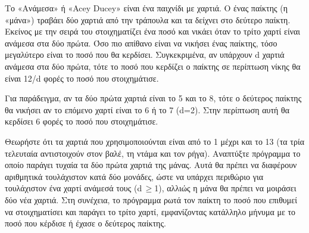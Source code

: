 \documentclass[a4paper,11pt,oneside]{book}
\begin{document}
\begin{exercise}
Το «Ανάμεσα» ή «Acey Ducey» είναι ένα παιχνίδι με χαρτιά. Ο ένας παίκτης (η «μάνα») τραβάει δύο χαρτιά από την τράπουλα και τα δείχνει στο δεύτερο παίκτη. Εκείνος με την σειρά του στοιχηματίζει ένα ποσό και νικάει όταν το τρίτο χαρτί είναι ανάμεσα στα δύο πρώτα. Όσο πιο απίθανο είναι να νικήσει ένας παίκτης, τόσο μεγαλύτερο είναι το ποσό που θα κερδίσει. Συγκεκριμένα, αν υπάρχουν d χαρτιά ανάμεσα στα δύο πρώτα, τότε το ποσό που κερδίζει ο παίκτης σε περίπτωση νίκης θα είναι 12/d φορές το ποσό που στοιχημάτισε.

\begin{note}
Για παράδειγμα, αν τα δύο πρώτα χαρτιά είναι το 5 και το 8, τότε ο δεύτερος παίκτης θα νικήσει αν το επόμενο χαρτί είναι το 6 ή το 7 (d=2). Στην περίπτωση αυτή θα κερδίσει 6 φορές το ποσό που στοιχημάτισε.
\end{note}

Θεωρήστε ότι τα χαρτιά που χρησιμοποιούνται είναι από το 1 μέχρι και το 13 (τα τρία τελευταία αντιστοιχούν στον βαλέ, τη ντάμα και τον ρήγα). Αναπτύξτε πρόγραμμα το οποίο παράγει τυχαία τα δύο πρώτα χαρτιά της μάνας. Αυτά θα πρέπει να διαφέρουν αριθμητικά τουλάχιστον κατά δύο μονάδες, ώστε να υπάρχει περιθώριο για τουλάχιστον ένα χαρτί ανάμεσά τους (d\,$\geq$1), αλλιώς η μάνα θα πρέπει να μοιράσει δύο νέα χαρτιά. Στη συνέχεια, το πρόγραμμα ρωτά τον παίκτη το ποσό που επιθυμεί να στοιχηματίσει και παράγει το τρίτο χαρτί, εμφανίζοντας κατάλληλο μήνυμα με το ποσό που κέρδισε ή έχασε ο δεύτερος παίκτης.
\end{exercise}


\section*{}
\vspace{-4\parskip}
\hrulefill


\end{document}
